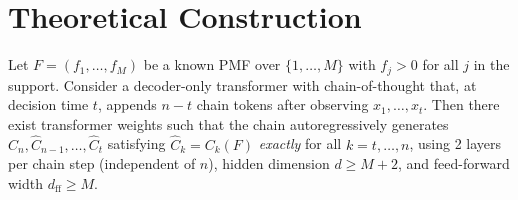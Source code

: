 \section{Theoretical Construction}

\begin{proposition}
\label{prop:cot-stopping}
Let $F = (f_1, \ldots, f_M)$ be a known PMF over $\{1,\ldots,M\}$ with $f_j > 0$ for all $j$ in the support.
Consider a decoder-only transformer with chain-of-thought that, at decision time $t$, appends $n - t$ chain tokens after observing $x_1, \ldots, x_t$.
Then there exist transformer weights such that the chain autoregressively generates $\hat C_n, \hat C_{n-1}, \ldots, \hat C_t$ satisfying $\hat C_k = C_k(F)$ \emph{exactly} for all $k = t, \ldots, n$, using 2 layers per chain step (independent of $n$), hidden dimension $d \ge M + 2$, and feed-forward width $d_{\mathrm{ff}} \ge M$.
\end{proposition}


